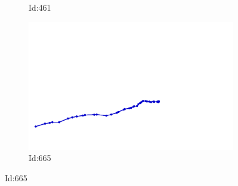 \documentclass[12pt,twoside]{report}
\begin{document}
\begin{figure}
\begin{subfigure}[b]{0.20\textwidth}
\caption{Id:461}
\end{subfigure}
\begin{subfigure}[b]{0.20\textwidth}
\centering
\includegraphics[width=\textwidth]{../../trajectories/665.png}
\caption{Id:665}
\end{subfigure}
\end{figure}
\end{document}
